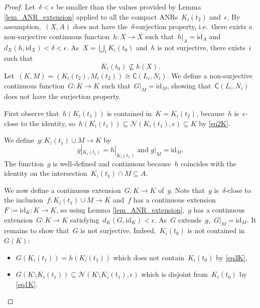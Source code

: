 \documentclass[english,11pt]{article}
\theoremstyle{plain}
\theoremstyle{remark}
\theoremstyle{definition}
\newcommand{\id}{\mathrm{id}}
\newcommand{\Ne}{\mathcal{N}}
\newcommand{\C}[1]{\mathsf{C}(#1)}%
\begin{document}
\begin{proof}
Let~$\delta<\epsilon$ be smaller than the values provided by Lemma
\ref{lem_ANR_extension} applied to all the compact ANRs~$K_i(t_{2})$
and~$\epsilon$. By assumption,~$(X,A)$ does not have the~$\delta$-surjection
property, i.e.~there exists a non-surjective continuous function~$h:X\to X$
such that~$h|_{A}=\id_{A}$ and~$d_{X}(h,\id_{X})<\delta<\epsilon$.
As~$X=\bigcup_{i}K_i({t_{0}})$ and~$h$ is not surjective, there exists~$i$ such that
\begin{equation}
K_i({t_{0}})\nsubseteq h(X).\label{eq3K}
\end{equation}
Let~$(K,M)=(K_i({t_{2}}),M_i({t_{2}}))\cong \C{L_i,N_i}$. We define a non-surjective continuous function~$G:K\to K$ such that~$G|_{M}=\id_{M}$, showing that~$\C{L_i,N_i}$ does not have the surjection property.

First observe that~$h(K_i({t_{1}}))$ is contained in~$K=K_i(t_2)$, because~$h$
is~$\epsilon$-close to the identity, so~$h(K_i({t_{1}}))\subseteq\Ne(K_i({t_{1}}),\epsilon)\subseteq K$ by \eqref{eq2K}.

We define~$g:K_i({t_{1}})\cup M\to K$ by 
\begin{equation*}
g|_{K_i({t_{1}})}=h|_{K_i({t_{1}})}\text{ and }g|_{M}=\id_{M}.
\end{equation*}
The function~$g$ is well-defined and continuous because~$h$ coincides with the identity on the intersection~$K_i({t_{1}})\cap M\subseteq A$.

We now define a continuous extension~$G:K\to K$ of~$g$. Note that~$g$
is~$\delta$-close to the inclusion~$f:K_i({t_{1}})\cup M\to K$
and~$f$ has a continuous extension~$F:=\id_{K}:K\to K$, so using
Lemma \ref{lem_ANR_extension},~$g$ has a continuous extension~$G:K\to K$
satisfying~$d_{K}(G,\id_{K})<\epsilon$. As~$G$ extends~$g$,~$G|_{M}=\id_{M}$.
It remains to show that~$G$ is not surjective. Indeed,~$K_i({t_{0}})$ is not
contained in~$G(K)$: 
\begin{itemize}
\item $G(K_i({t_{1}}))=h(K_i({t_{1}}))$ which does not contain~$K_i({t_{0}})$
by \eqref{eq3K}, 
\item $G(K\setminus K_i({t_{1}}))\subseteq\Ne(K\setminus K_i({t_{1}}),\epsilon)$
which is disjoint from~$K_i({t_{0}})$ by \eqref{eq1K}.\qedhere
\end{itemize}
\end{proof}
\end{document}
